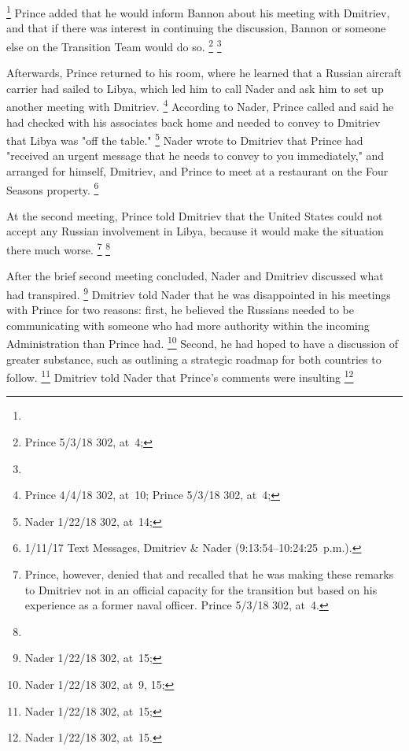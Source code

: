 \footnote{}
Prince added that he would inform Bannon about his meeting with Dmitriev, and that if there was interest in continuing the discussion, Bannon or someone else on the Transition Team would do so.%
\footnote{Prince 5/3/18 302, at~4; }
\footnote{}

Afterwards, Prince returned to his room, where he learned that a Russian aircraft carrier had sailed to Libya, which led him to call Nader and ask him to set up another meeting with Dmitriev.%
\footnote{Prince 4/4/18 302, at~10;
Prince 5/3/18 302, at~4;
}
According to Nader, Prince called and said he had checked with his associates back home and needed to convey to Dmitriev that Libya was "off the table."%
\footnote{Nader 1/22/18 302, at~14;
}
Nader wrote to Dmitriev that Prince had "received an urgent message that he needs to convey to you immediately," and arranged for himself, Dmitriev, and Prince to meet at a restaurant on the Four Seasons property.%
\footnote{ 1/11/17 Text Messages, Dmitriev \& Nader (9:13:54--10:24:25~p.m.).}

At the second meeting, Prince told Dmitriev that the United States could not accept any Russian involvement in Libya, because it would make the situation there much worse.%
\footnote{
Prince, however, denied that and recalled that he was making these remarks to Dmitriev not in an official capacity for the transition but based on his experience as a former naval officer. Prince 5/3/18 302, at~4.}
\footnote{}

After the brief second meeting concluded, Nader and Dmitriev discussed what had transpired.%
\footnote{Nader 1/22/18 302, at~15;
}
Dmitriev told Nader that he was disappointed in his meetings with Prince for two reasons: first, he believed the Russians needed to be communicating with someone who had more authority within the incoming Administration than Prince had.%
\footnote{Nader 1/22/18 302, at~9, 15;
}
Second, he had hoped to have a discussion of greater substance, such as outlining a strategic roadmap for both countries to follow.%
\footnote{Nader 1/22/18 302, at~15;
}
Dmitriev told Nader that
Prince's comments
were insulting
\footnote{ Nader 1/22/18 302, at~15.}


